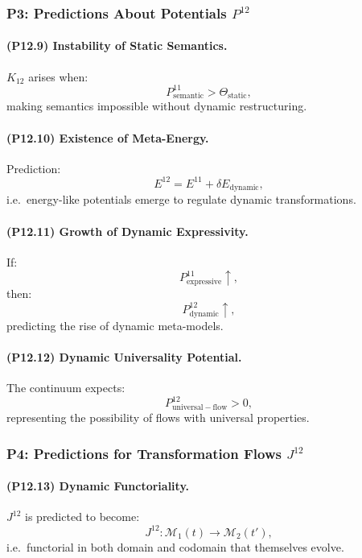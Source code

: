 \subsubsection{P3: Predictions About Potentials $P^{12}$}

\paragraph{(P12.9) Instability of Static Semantics.}
$K_{12}$ arises when:
\[
P_{\mathrm{semantic}}^{11} > \Theta_{\mathrm{static}},
\]
making semantics impossible without dynamic restructuring.

\paragraph{(P12.10) Existence of Meta-Energy.}
Prediction:
\[
E^{12} = E^{11} + \delta E_{\mathrm{dynamic}},
\]
i.e.\ energy-like potentials emerge to regulate dynamic transformations.

\paragraph{(P12.11) Growth of Dynamic Expressivity.}
If:
\[
P_{\mathrm{expressive}}^{11} \uparrow,
\]
then:
\[
P_{\mathrm{dynamic}}^{12} \uparrow,
\]
predicting the rise of dynamic meta-models.

\paragraph{(P12.12) Dynamic Universality Potential.}
The continuum expects:
\[
P_{\mathrm{universal-flow}}^{12} > 0,
\]
representing the possibility of flows with universal properties.

\subsubsection{P4: Predictions for Transformation Flows $J^{12}$}

\paragraph{(P12.13) Dynamic Functoriality.}
$J^{12}$ is predicted to become:
\[
J^{12}: \mathcal{M}_1(t) \to \mathcal{M}_2(t'),
\]
i.e.\ functorial in both domain and codomain that themselves evolve.

